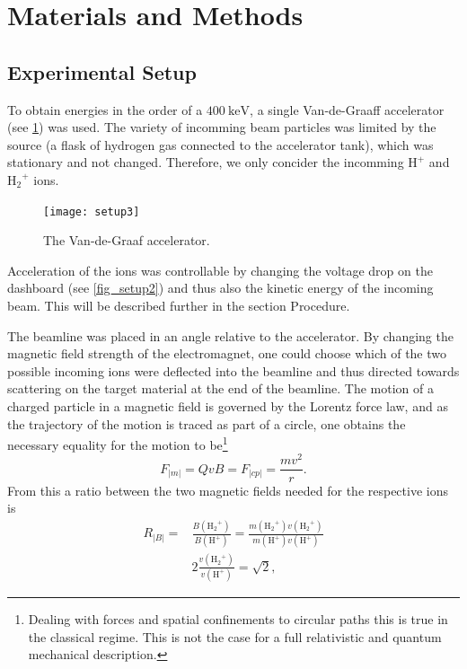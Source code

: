 \section{Materials and Methods}
\subsection{Experimental Setup}
To obtain energies in the order of a $\SI{400}{\kilo\electronvolt}$, a single Van-de-Graaff accelerator (see \cref{fig_setup3}) was used. The variety of incomming beam particles was limited by the source (a flask of hydrogen gas connected to the accelerator tank), which was stationary and not changed. Therefore, we only concider the incomming $\mathrm{H^+}$ and $\mathrm{{H_{2}}^{+}}$ ions. %
%
\begin{figure}[t]
    \centering
    \texttt{[image: setup3]}
    \caption{The Van-de-Graaf accelerator.}
    \label{fig_setup3}
\end{figure}
%
Acceleration of the ions was controllable by changing the voltage drop on the
dashboard (see \cref{fig_setup2}) and thus also the kinetic energy of the
incoming beam. This will be described further in the section Procedure.

The beamline was placed in an angle relative to the accelerator. By changing the magnetic field strength of the electromagnet, one could choose which of the two possible incoming ions were deflected into the beamline and thus directed towards scattering on the target material at the end of the beamline.
The motion of a charged particle in a magnetic field is governed by the Lorentz force law, and as the trajectory of the motion is traced as part of a circle, one obtains the necessary equality for the motion to be\footnote{Dealing with forces and spatial confinements to circular paths this is true in the classical regime. This is not the case for a full relativistic and quantum mechanical description.}
\begin{equation}
F_|m| = QvB = F_|cp| = \frac{mv^2}{r}.
\end{equation}
From this a ratio between the two magnetic fields needed for the respective ions is
\begin{align}
    R_|B| = & \frac{B(\mathrm{{H_2}^+})}{B(\mathrm{H^+})} = \frac{m(\mathrm{{H_2}^+})
    v(\mathrm{{H_2}^+})}{m(\mathrm{H^+})v(\mathrm{H^+})}\\
    & 2 \frac{v(\mathrm{{H_2}^+})}{v(\mathrm{H^+})} = \sqrt{2},
\end{align}

